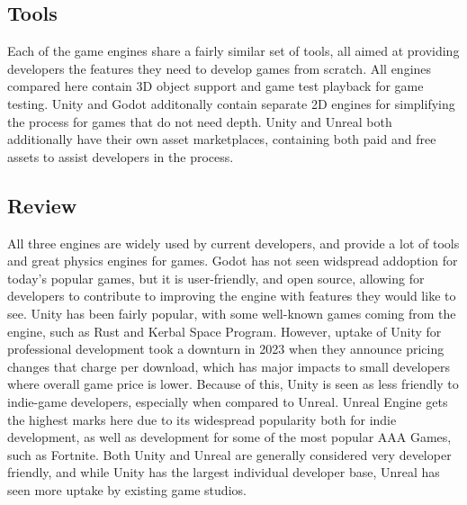\subsection{Tools}\label{sec:tools}

Each of the game engines share a fairly similar set of tools, all aimed at providing developers the features they need to develop games from scratch.
All engines compared here contain 3D object support and game test playback for game testing. Unity and Godot additonally contain separate 2D engines
for simplifying the process for games that do not need depth. Unity and Unreal both additionally have their own asset marketplaces, containing
both paid and free assets to assist developers in the process.

\subsection{Review}\label{sec:review}

All three engines are widely used by current developers, and provide a lot of tools and great physics engines for games. Godot has not seen
widspread addoption for today's popular games, but it is user-friendly, and open source, allowing for developers to contribute to improving
the engine with features they would like to see. Unity has been fairly popular, with some well-known games coming from the engine, such as Rust
and Kerbal Space Program. However, uptake of Unity for professional development took a downturn in 2023 when they announce pricing changes that
charge per download, which has major impacts to small developers where overall game price is lower. Because of this, Unity is seen as less
friendly to indie-game developers, especially when compared to Unreal. Unreal Engine gets the highest marks here due to its widespread popularity
both for indie development, as well as development for some of the most popular AAA Games, such as Fortnite. Both Unity and Unreal are generally considered very
developer friendly, and while Unity has the largest individual developer base, Unreal has seen more uptake by existing game studios.
